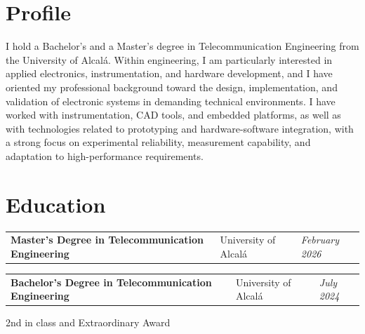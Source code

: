 \section{Profile}
\begin{onecolentry}
	I hold a Bachelor's and a Master's degree in Telecommunication Engineering from the University of Alcalá. Within engineering, I am particularly interested in applied electronics, instrumentation, and hardware development, and I have oriented my professional background toward the design, implementation, and validation of electronic systems in demanding technical environments. I have worked with instrumentation, CAD tools, and embedded platforms, as well as with technologies related to prototyping and hardware-software integration, with a strong focus on experimental reliability, measurement capability, and adaptation to high-performance requirements.
\end{onecolentry}

\vspace{-5pt}

\section{Education}

\begin{onecolentry}
	\begin{tabularx}{\textwidth}{@{}>{\raggedright\arraybackslash}X>{\raggedright\arraybackslash}p{3.6cm}>{\raggedleft\arraybackslash}p{2.4cm}@{}}
		\textbf{Master's Degree in Telecommunication Engineering} & University of Alcalá & \textit{February 2026}
	\end{tabularx}

\end{onecolentry}

\vspace{0.2 cm}

\begin{onecolentry}
	\begin{tabularx}{\textwidth}{@{}>{\raggedright\arraybackslash}X>{\raggedright\arraybackslash}p{3.6cm}>{\raggedleft\arraybackslash}p{2.4cm}@{}}
		\textbf{Bachelor's Degree in Telecommunication Engineering} & University of Alcalá & \textit{July 2024}
	\end{tabularx}
	
	\vspace{0.05 cm}
	\hspace{0.2cm}2nd in class and Extraordinary Award
\end{onecolentry}


